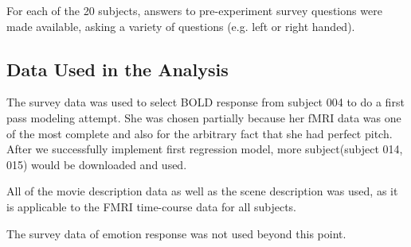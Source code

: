 \par For each of the 20 subjects, answers to pre-experiment survey questions were made available, asking a variety of questions (e.g. left or right handed). 


\subsection{Data Used in the Analysis}
\par The survey data was used to select BOLD response from subject 004 to do a first pass modeling attempt. She was chosen partially because her fMRI data was one of the most complete and also for the arbitrary fact that she had perfect pitch. After we successfully implement first regression model, more subject(subject 014, 015) would be downloaded and used.

\par All of the movie description data as well as the scene description was used, as it is applicable to the FMRI time-course data for all subjects. 

\par The survey data of emotion response was not used beyond this point.





